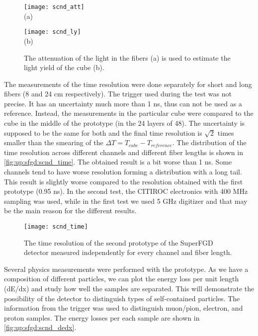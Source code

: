\documentclass[main.tex]{subfiles}
\begin{document}
\begin{figure}[!ht]
	\centering
	\begin{minipage}{0.49\linewidth}
		\centering
		\texttt{[image: scnd\_att]} \\ (a)
	\end{minipage}
	\begin{minipage}{0.49\linewidth}
		\centering
		\texttt{[image: scnd\_ly]} \\ (b)
	\end{minipage}
	\caption{The attenuation of the light in the fibers (a) is used to estimate the light yield of the cube (b).}
	\label{fig:up:sfgd:scnd_light}
\end{figure}

The measurements of the time resolution were done separately for short and long fibers (8 and 24 cm respectively). The trigger used during the test was not precise. It has an uncertainty much more than 1 ns, thus can not be used as a reference. Instead, the measurements in the particular cube were compared to the cube in the middle of the prototype (in the 24 layers of 48). The uncertainty is supposed to be the same for both and the final time resolution is $\sqrt{2}$ times smaller than the smearing of the $\Delta T=T_{cube}-T_{reference}$. The distribution of the time resolution across different channels and different fiber lengths is shown in \autoref{fig:up:sfgd:scnd_time}. The obtained result is a bit worse than 1 ns. Some channels tend to have worse resolution forming a distribution with a long tail. This result is slightly worse compared to the resolution obtained with the first prototype (0.95 ns). In the second test, the CITIROC electronics with 400 MHz sampling was used, while in the first test we used 5 GHz digitizer and that may be the main reason for the different results.

\begin{figure}[!ht]
	\centering
	\texttt{[image: scnd\_time]}
	\caption{The time resolution of the second prototype of the SuperFGD detector measured independently for every channel and fiber length.}
	\label{fig:up:sfgd:scnd_time}
\end{figure}

Several physics measurements were performed with the prototype. As we have a composition of different particles, we can plot the energy loss per unit length (dE/dx) and study how well the samples are separated. This will demonstrate the possibility of the detector to distinguish types of self-contained particles. The information from the trigger was used to distinguish muon/pion, electron, and proton samples. The energy losses per each sample are shown in \autoref{fig:up:sfgd:scnd_dedx}.
\end{document}
